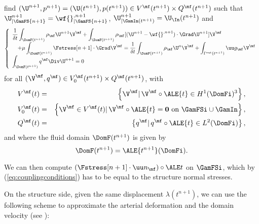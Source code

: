 find $(\U^{n+1},p^{n+1}) = (\U(t^{n+1}),p(t^{n+1})) \in V^\mf(t^{n+1})\times Q^\mf(t^{n+1})$ such
that $\U^{n+1}_{|\GamFS{n+1}} =  \wf{}^{,n+1}_{|\GamFS{n+1}}$,
$\U^{n+1}_{|\GamIn(t^{n+1})} =  \U_\In(t^{n+1})$
and
\begin{equation} \label{eq:variationalfluid}
\left\{
\begin{array}{l}
\displaystyle \frac{1}{\delta t}\int_{\DomF(t^{n+1})} \rho_\mf \U^{n+1}\V^\mf
+ \displaystyle \int_{\DomF(t^{n+1})}\rho_\mf [(\U^{n+1} -  \wf{}^{,n+1})\cdot \Grad \U^{n+1}]\V^\mf\\ \quad
\displaystyle + \mu\int_{\DomF(t^{n+1})} \Fstress[{n+1}] \cdot \Grad \V^{\mf}
= \displaystyle \frac{1}{\delta t} \int_{\DomF(t^{n+1})} \rho_\mf \U^n \V^\mf +
\int_{\Gamma^{\mathrm{out}}(t^{n+1})} \uu g_{\mf} \V^\mf \\
\displaystyle \int_{\DomF(t^{n+1})} q^\mf \Div \U^{n+1}  = 0
\end{array}
\right.
\end{equation}
for all $(\V^\mf,q^\mf) \in V_0^\mf(t^{n+1}) \times Q^\mf(t^{n+1})$, with
\begin{eqnarray*}
V^\mf(t) & = & \left\{\V^\mf \vert \,   \V^\mf \circ \ALE {t}  \in H^1(\DomFi)^3\right\}, \\
V_0^\mf(t) & = & \left\{\V^\mf \in V^\mf(t) \vert \,\V^\mf  \circ \ALE {t}
= \mathbf{0} \mbox { on } \GamFSi \cup \GamIn \right\}, \\
Q^\mf (t)& = & \left\{q^\mf  \vert \, q^\mf \circ \ALE {t} \in L^2(\DomFi)\right\},
\end{eqnarray*}
and where the fluid domain $\DomF(t^{n+1})$ is given by
\begin{equation*}
\DomF(t^{n+1})  = \ALE {t^{n+1}}(\DomFi).
\end{equation*}

We can then compute $  (\Fstress[{n+1}] \cdot {\uu n}_\mf) \circ \ALE t $ on $ \GamFSi$,
which by (\ref{eq:couplingconditions}) has to be equal to the structure normal stresses.


On the structure side, given the same displacement $\lambda(t^{n+1})$, we can use the
following scheme to approximate the arterial deformation and the domain
velocity (see \cite{FerMou04:NewtonFS}):

